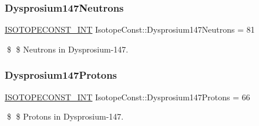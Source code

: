 \subsubsection{\texorpdfstring{Dysprosium147\+Neutrons}{Dysprosium147Neutrons}}
{\footnotesize\ttfamily \mbox{\hyperlink{group___isotope_const-_macros_ga5f18360b3e99483a35c32d789e62621c}{I\+S\+O\+T\+O\+P\+E\+C\+O\+N\+S\+T\+\_\+\+I\+NT}} Isotope\+Const\+::\+Dysprosium147\+Neutrons = 81}

\$ \$ Neutrons in Dysprosium-\/147. \mbox{\label{group___isotope_const-_dysprosium-_dy147_gaec6269d0ad07c9eb1e9196da45d2f1ab}} 
\subsubsection{\texorpdfstring{Dysprosium147\+Protons}{Dysprosium147Protons}}
{\footnotesize\ttfamily \mbox{\hyperlink{group___isotope_const-_macros_ga5f18360b3e99483a35c32d789e62621c}{I\+S\+O\+T\+O\+P\+E\+C\+O\+N\+S\+T\+\_\+\+I\+NT}} Isotope\+Const\+::\+Dysprosium147\+Protons = 66}

\$ \$ Protons in Dysprosium-\/147. 